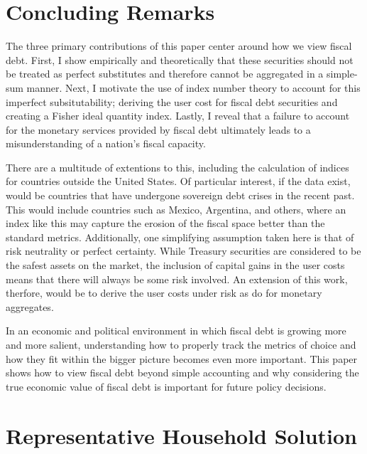 \documentclass[11pt,a4paper,margin=1.5in]{article}
\begin{document}
\section{Concluding Remarks}
\label{sec:Conclusion}
The three primary contributions of this paper center around how we view fiscal debt.
First, I show empirically and theoretically that these securities should not be treated as perfect substitutes and therefore cannot be aggregated in a simple-sum manner. 
Next, I motivate the use of index number theory to account for this imperfect subsitutability; deriving the user cost for fiscal debt securities and creating a Fisher ideal quantity index.
Lastly, I reveal that a failure to account for the monetary services provided by fiscal debt ultimately leads to a misunderstanding of a nation's fiscal capacity. 

There are a multitude of extentions to this, including the calculation of indices for countries outside the United States.
Of particular interest, if the data exist, would be countries that have undergone sovereign debt crises in the recent past.
This would include countries such as Mexico, Argentina, and others, where an index like this may capture the erosion of the fiscal space better than the standard metrics.
Additionally, one simplifying assumption taken here is that of risk neutrality or perfect certainty.
While Treasury securities are considered to be the safest assets on the market, the inclusion of capital gains in the user costs means that there will always be some risk involved.
An extension of this work, therfore, would be to derive the user costs under risk as \citet{Barnett-Liu-Jensen:1997} do for monetary aggregates.

In an economic and political environment in which fiscal debt is growing more and more salient, understanding how to properly track the metrics of choice and how they fit within the bigger picture becomes even more important.
This paper shows how to view fiscal debt beyond simple accounting and why considering the true economic value of fiscal debt is important for future policy decisions. 
\newpage




\newpage
\appendix
{}
\section{Representative Household Solution}
\label{app:HH_Solution}
\end{document}
